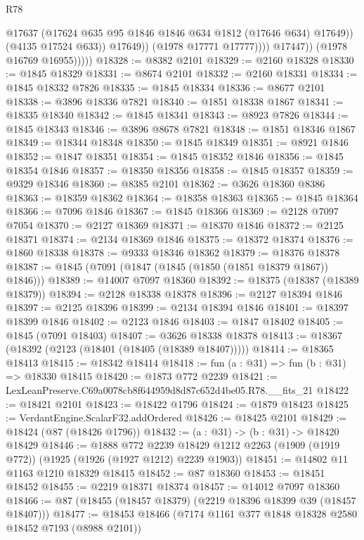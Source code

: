 \begin{lexlean}{R78}
\begin{coremodule}
                              @17637
                              (@17624 @635 @95 @1846 @1846 @634 @1812 (@17646 @634) @17649))
                            (@4135 @17524 @633))
                          @17649))
                      (@1978 @17771 @17777))))
                @17447))
            (@1978 @16769 @16955)))))
@18328 := @8382 @2101
@18329 := @2160 @18328
@18330 := @1845 @18329
@18331 := @8674 @2101
@18332 := @2160 @18331
@18334 := @1845 @18332 @7826
@18335 := @1845 @18334
@18336 := @8677 @2101
@18338 := @3896 @18336 @7821
@18340 := @1851 @18338 @1867
@18341 := @18335 @18340
@18342 := @1845 @18341
@18343 := @8923 @7826
@18344 := @1845 @18343
@18346 := @3896 @8678 @7821
@18348 := @1851 @18346 @1867
@18349 := @18344 @18348
@18350 := @1845 @18349
@18351 := @8921 @1846
@18352 := @1847 @18351
@18354 := @1845 @18352 @1846
@18356 := @1845 @18354 @1846
@18357 := @18350 @18356
@18358 := @1845 @18357
@18359 := @9329 @18346
@18360 := @8385 @2101
@18362 := @3626 @18360 @8386
@18363 := @18359 @18362
@18364 := @18358 @18363
@18365 := @1845 @18364
@18366 := @7096 @1846
@18367 := @1845 @18366
@18369 := @2128 @7097 @7054
@18370 := @2127 @18369
@18371 := @18370 @1846
@18372 := @2125 @18371
@18374 := @2134 @18369 @1846
@18375 := @18372 @18374
@18376 := @1860 @18338
@18378 := @9333 @18346 @18362
@18379 := @18376 @18378
@18387 := @1845 (@7091 (@1847 (@1845 (@1850 (@1851 @18379 @1867)) @1846)))
@18389 := @14007 @7097 @18360
@18392 := @18375 (@18387 (@18389 @18379))
@18394 := @2128 @18338 @18378
@18396 := @2127 @18394 @1846
@18397 := @2125 @18396
@18399 := @2134 @18394 @1846
@18401 := @18397 @18399 @1846
@18402 := @2123 @1846
@18403 := @1847 @18402
@18405 := @1845 (@7091 @18403)
@18407 := @3626 @18338 @18378
@18413 := @18367 (@18392 (@2123 (@18401 (@18405 (@18389 @18407)))))
@18414 := @18365 @18413
@18415 := @18342 @18414
@18418 := fun (a : @31) => fun (b : @31) => @18330 @18415
@18420 := @1873 @772 @2239
@18421 := LexLeanPreserve.C69a0078cb8f644959d8d87c652d4be05.R78.__fits_21
@18422 := @18421 @2101
@18423 := @18422 @1796
@18424 := @1879 @18423
@18425 := VerdantEngine.ScalarF32.addOrdered
@18426 := @18425 @2101
@18429 := @18424 (@87 (@18426 @1796))
@18432 := (a : @31) -> (b : @31) -> @18420 @18429
@18446 := @1888
    @772
    @2239
    @18429
    @1212
    @2263
    (@1909 (@1919 @772))
    (@1925 (@1926 (@1927 @1212) @2239 @1903))
@18451 := @14802 @11 @1163 @1210 @18329 @18415
@18452 := @87 @18360
@18453 := @18451 @18452
@18455 := @2219 @18371 @18374
@18457 := @14012 @7097 @18360
@18466 := @87 (@18455 (@18457 @18379) (@2219 @18396 @18399 @39 (@18457 @18407)))
@18477 := @18453 @18466 (@7174 @1161 @377 @1848 @18328 @2580 @18452 @7193 (@8988 @2101))

\end{coremodule}
\end{lexlean}
